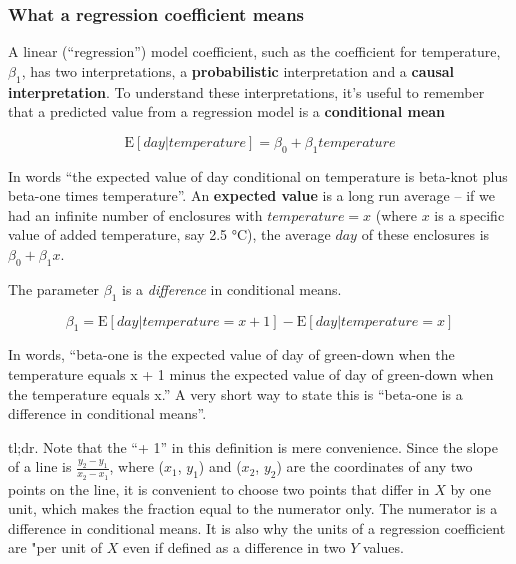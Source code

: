 \documentclass[]{book}
\begin{document}
\hypertarget{what-a-regression-coefficient-means}{%
\subsubsection{What a regression coefficient means}\label{what-a-regression-coefficient-means}}

A linear (``regression'') model coefficient, such as the coefficient for temperature, \(\beta_1\), has two interpretations, a \textbf{probabilistic} interpretation and a \textbf{causal interpretation}. To understand these interpretations, it's useful to remember that a predicted value from a regression model is a \textbf{conditional mean}

\begin{equation}
\textrm{E}[day|temperature] = \beta_0 + \beta_1 temperature
\label{eq:continuous-x-conditional-mean}
\end{equation}

In words ``the expected value of day conditional on temperature is beta-knot plus beta-one times temperature''. An \textbf{expected value} is a long run average -- if we had an infinite number of enclosures with \(temperature=x\) (where \(x\) is a specific value of added temperature, say 2.5 °C), the average \(day\) of these enclosures is \(\beta_0 + \beta_1 x\).

The parameter \(\beta_1\) is a \emph{difference} in conditional means.

\begin{equation}
\beta_1 = \textrm{E}[day|temperature = x+1] - \textrm{E}[day|temperature = x]
\label{eq:beta}
\end{equation}

In words, ``beta-one is the expected value of day of green-down when the temperature equals x + 1 minus the expected value of day of green-down when the temperature equals x.'' A very short way to state this is ``beta-one is a difference in conditional means''.

tl;dr. Note that the ``+ 1'' in this definition is mere convenience. Since the slope of a line is \(\frac{y_2 - y_1}{x_2 - x_1}\), where (\(x_1\), \(y_1\)) and (\(x_2\), \(y_2\)) are the coordinates of any two points on the line, it is convenient to choose two points that differ in \(X\) by one unit, which makes the fraction equal to the numerator only. The numerator is a difference in conditional means. It is also why the units of a regression coefficient are "per unit of \(X\) even if defined as a difference in two \(Y\) values.
\end{document}
